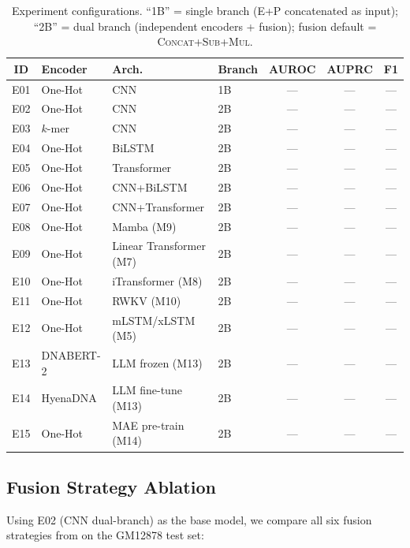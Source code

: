 \begin{table}[H]
\centering
\caption{Experiment configurations.
         ``1B'' = single branch (E+P concatenated as input);
         ``2B'' = dual branch (independent encoders + fusion);
         fusion default = \textsc{Concat+Sub+Mul}.}
\label{tab:ablation}
\begin{tabular}{clllccc}
\toprule
ID & Encoder & Arch. & Branch & AUROC & AUPRC & F1 \\
\midrule
E01 & One-Hot  & CNN           & 1B & --- & --- & --- \\
E02 & One-Hot  & CNN           & 2B & --- & --- & --- \\
E03 & $k$-mer  & CNN           & 2B & --- & --- & --- \\
E04 & One-Hot  & BiLSTM        & 2B & --- & --- & --- \\
E05 & One-Hot  & Transformer   & 2B & --- & --- & --- \\
E06 & One-Hot  & CNN+BiLSTM    & 2B & --- & --- & --- \\
E07 & One-Hot  & CNN+Transformer & 2B & --- & --- & --- \\
E08 & One-Hot  & Mamba (M9)            & 2B & --- & --- & --- \\
E09 & One-Hot  & Linear Transformer (M7) & 2B & --- & --- & --- \\
E10 & One-Hot  & iTransformer (M8)     & 2B & --- & --- & --- \\
E11 & One-Hot  & RWKV (M10)            & 2B & --- & --- & --- \\
E12 & One-Hot  & mLSTM/xLSTM (M5)      & 2B & --- & --- & --- \\
\midrule
E13 & DNABERT-2  & LLM frozen (M13)    & 2B & --- & --- & --- \\
E14 & HyenaDNA   & LLM fine-tune (M13) & 2B & --- & --- & --- \\
E15 & One-Hot    & MAE pre-train (M14)  & 2B & --- & --- & --- \\
\bottomrule
\end{tabular}
\end{table}

\subsection{Fusion Strategy Ablation}

Using E02 (CNN dual-branch) as the base model, we compare all six fusion strategies
from  on the GM12878 test set:

